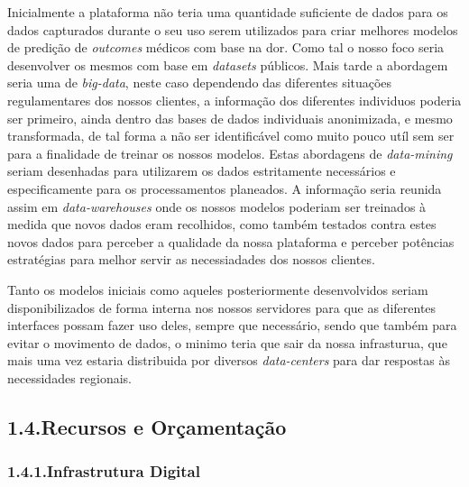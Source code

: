 \documentclass{article}
\begin{document}
\noindent{}Inicialmente a plataforma não teria uma quantidade suficiente de dados para os dados capturados durante o seu uso serem utilizados para criar melhores modelos de predição de \emph{outcomes} médicos com base na dor. Como tal o nosso foco seria desenvolver os mesmos com base em \emph{datasets} públicos. Mais tarde a abordagem seria uma de \emph{big-data}, neste caso dependendo das diferentes situações regulamentares dos nossos clientes, a informação dos diferentes individuos poderia ser primeiro, ainda dentro das bases de dados individuais anonimizada, e mesmo transformada, de tal forma a não ser identificável como muito pouco utíl sem ser para a finalidade de treinar os nossos modelos. Estas abordagens de \emph{data-mining} seriam desenhadas para utilizarem os dados estritamente necessários e especificamente para os processamentos planeados. A informação seria reunida assim em \emph{data-warehouses} onde os nossos modelos poderiam ser treinados à medida que novos dados eram recolhidos, como também testados contra estes novos dados para perceber a qualidade da nossa plataforma e perceber potências estratégias para melhor servir as necessiadades dos nossos clientes.%

Tanto os modelos iniciais como aqueles posteriormente desenvolvidos seriam disponibilizados de forma interna nos nossos servidores para que as diferentes interfaces possam fazer uso deles, sempre que necessário, sendo que também para evitar o movimento de dados, o minimo teria que sair da nossa infrasturua, que mais uma vez estaria distribuida por diversos \emph{data-centers} para dar respostas às necessidades regionais.%

\subsection{1.4.\hspace*{0.5em}Recursos e Orçamentação}\label{sec-recursos-e-oramentao}%

\subsubsection{1.4.1.\hspace*{0.5em}Infrastrutura Digital}\label{sec-infrastrutura-digital}%
\end{document}
